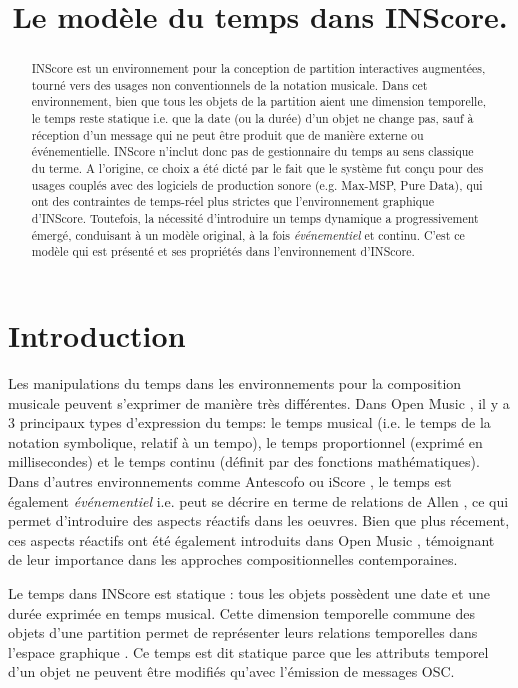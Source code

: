 \documentclass{article}
\title{Le modèle du temps dans INScore.}
\begin{document}
%
\maketitle
%
\begin{abstract}
INScore est un environnement pour la conception de partition interactives augmentées, tourné vers des usages non conventionnels de la notation musicale. Dans cet environnement, bien que tous les objets de la partition aient une dimension temporelle, le temps reste statique i.e. que la date (ou la durée) d'un objet ne change pas, sauf à réception d'un message qui ne peut être produit que de manière externe ou événementielle. INScore n'inclut donc pas de gestionnaire du temps au sens classique du terme. 
A l'origine, ce choix a été dicté par le fait que le système fut conçu pour des usages couplés avec des logiciels de production sonore (e.g. Max-MSP, Pure Data), qui ont des contraintes de temps-réel plus strictes que l'environnement graphique d'INScore.
Toutefois, la nécessité d'introduire un temps dynamique a progressivement émergé, conduisant à un modèle original, à la fois \emph{événementiel} et continu. C'est ce modèle qui est présenté et ses propriétés dans l'environnement d'INScore.
\end{abstract}

\section{Introduction}\label{sec:introduction}

Les manipulations du temps dans les environnements pour la composition musicale peuvent s'exprimer de manière très différentes.
Dans Open Music \cite{bresson08}, il y a 3 principaux types d'expression du temps: le temps musical (i.e. le temps de la notation symbolique, relatif à un tempo), le temps proportionnel (exprimé en millisecondes) et le temps continu (définit par des fonctions mathématiques). 
Dans d'autres environnements comme Antescofo \cite{acont08} ou iScore \cite{AllombertDA08}, le temps est également \textit{événementiel} i.e. peut se décrire en terme de relations de Allen \cite{Allen:1983:MKT:182.358434}, ce qui permet d'introduire des aspects réactifs dans les oeuvres. 
Bien que plus récement, ces aspects réactifs ont été également introduits dans Open Music \cite{bresson:hal-00965747}, témoignant de leur importance dans les approches compositionnelles contemporaines.

Le temps dans INScore \cite{Fober:12a} est statique : tous les objets possèdent une date et une durée exprimée en temps musical. Cette dimension temporelle commune des objets d'une partition  permet de représenter leurs relations temporelles dans l'espace graphique \cite{fober:10b}. Ce temps est dit statique parce que les attributs temporel d'un objet ne peuvent être modifiés qu'avec l'émission de messages OSC.
\end{document}
